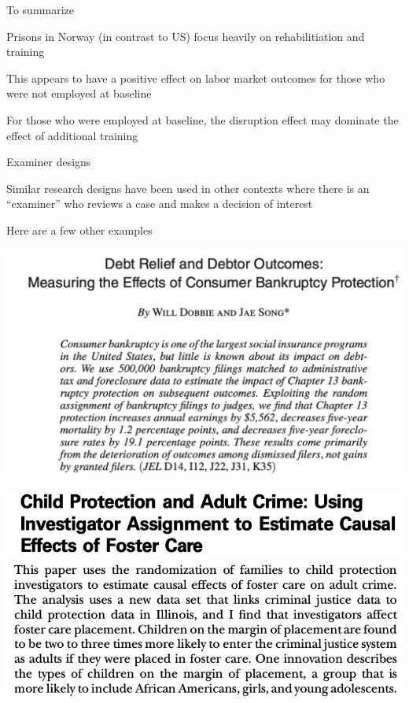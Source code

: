 \documentclass[11pt,english,handout]{beamer}
\newenvironment{wideitemize}{\itemize\addtolength{\itemsep}{10pt}}{\enditemize}
\begin{document}
\begin{frame}{To summarize}
	\begin{wideitemize}
		\item
		Prisons in Norway (in contrast to US) focus heavily on rehabilitiation and training
		
		\item
		This appears to have a positive effect on labor market outcomes for those who were not employed at baseline
		
		\item
		For those who were employed at baseline, the disruption effect may dominate the effect of additional training
	\end{wideitemize}
\end{frame}

\begin{frame}{Examiner designs}
	\begin{wideitemize}
		\item
		Similar research designs have been used in other contexts where there is an ``examiner'' who reviews a case and makes a decision of interest	
		
		\item
		Here are a few other examples
	\end{wideitemize}
\end{frame}

\begin{frame}
	\centering
	\includegraphics[width = 0.9 \linewidth]{bankruptcy-iv}
\end{frame}


\begin{frame}
	\centering
	\includegraphics[width = 0.9 \linewidth]{foster-care-1}
	\includegraphics[width = 0.9 \linewidth]{foster-care-2}
\end{frame}
\end{document}
